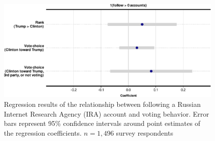 \documentclass[
  12pt,
]{article}
\begin{document}
\begin{figure}
\centering
\includegraphics{Supplementary_Information_files/figure-latex/Supplementary-Figure-E8-1.pdf}
\caption{\label{fig:Supplementary-Figure-E8}Regression results of the relationship between following a Russian Internet Research Agency (IRA) account and voting behavior. Error bars represent 95\% confidence intervals around point estimates of the regression coefficients. \(n = 1,496\) survey respondents}
\end{figure}
\end{document}
